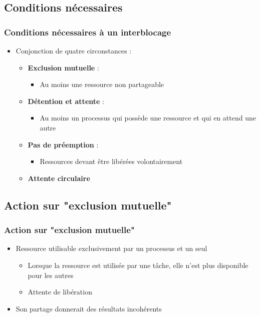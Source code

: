 \subsection{Conditions nécessaires}
\begin{frame}
\frametitle{Conditions nécessaires à un interblocage}
\begin{itemize}
\item Conjonction de quatre circonstances :
\begin{itemize}
\item \textbf{Exclusion mutuelle} :
\begin{itemize}
\item Au moins une ressource non partageable
\end{itemize}
\item \textbf{Détention et attente} :
\begin{itemize}
\item Au moins un processus qui possède une ressource et qui en attend une autre
\end{itemize}
\item \textbf{Pas de préemption} :
\begin{itemize}
\item Ressources devant être libérées volontairement
\end{itemize}
\item \textbf{Attente circulaire}
\end{itemize}
\end{itemize}
\end{frame}

\subsection{Action sur "exclusion mutuelle"}

\begin{frame}
\frametitle{Action sur "exclusion mutuelle"}
\begin{itemize}
\item Ressource utilisable exclusivement par un processus et un seul
\begin{itemize}
\item Lorsque la ressource est utilisée par une tâche, elle n’est plus disponible pour les autres
\item Attente de libération
\end{itemize}
\item Son partage donnerait des résultats incohérents
\end{itemize}
\end{frame}


